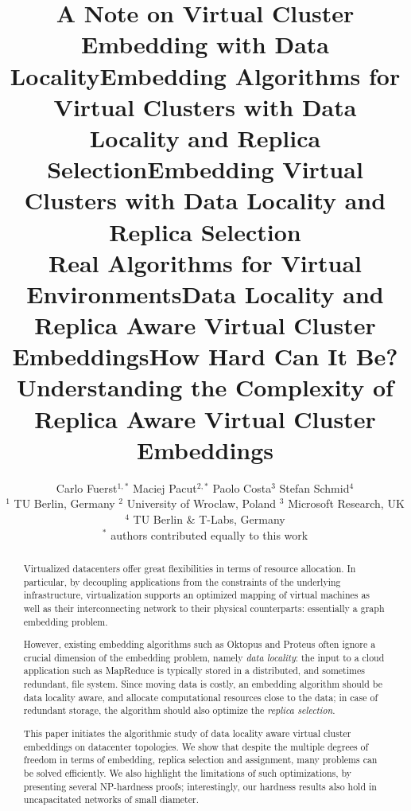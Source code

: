 \documentclass[conference,10pt]{IEEEtran}
\title{A Note on Virtual Cluster Embedding with Data Locality}
\title{Embedding Algorithms for Virtual Clusters with Data Locality and Replica Selection}
\title{Embedding Virtual Clusters with Data Locality and Replica Selection\\{\Large Real Algorithms for Virtual Environments}}
\title{Data Locality and Replica Aware Virtual Cluster Embeddings}
\title{How Hard Can It Be?\\{\Large Understanding the Complexity of  
Replica Aware Virtual Cluster Embeddings}}
\author{Carlo Fuerst$^{1,*}$ \quad Maciej Pacut$^{2,*}$ \quad Paolo Costa$^3$ \quad Stefan Schmid$^4$\\
{\small $^1$ TU Berlin, Germany \quad $^2$ University of Wroclaw, Poland \quad $^3$ Microsoft Research, UK \quad $^4$ TU Berlin \& T-Labs, Germany} \\ {\small $^*$ authors contributed equally to this work}}
\begin{document}
\maketitle

\sloppy

\begin{abstract}
Virtualized datacenters offer great flexibilities in terms of resource allocation. In particular, by
decoupling applications from the constraints of the underlying infrastructure, virtualization
supports an optimized mapping of virtual machines as well as their interconnecting network
to their
physical counterparts: essentially a graph embedding problem.

However, existing embedding algorithms such as Oktopus and Proteus
often ignore a crucial dimension of the embedding problem, namely \emph{data locality}:
the input to a cloud application such as MapReduce is typically stored in a distributed,
and sometimes redundant, file system. Since moving
data is costly, an embedding algorithm should be data locality aware,
and allocate computational resources close to the data; in case of redundant storage, the algorithm should also optimize the \emph{replica selection}.

This paper initiates the algorithmic study of data locality aware virtual cluster embeddings
on datacenter topologies.
We
show that
despite the multiple degrees of freedom in terms of embedding, replica selection and assignment,
many problems can be
solved efficiently. We also highlight the limitations of such optimizations,
by presenting several NP-hardness proofs; interestingly,
our hardness results also hold in uncapacitated networks of small diameter.
\end{abstract}


%

\end{document}
